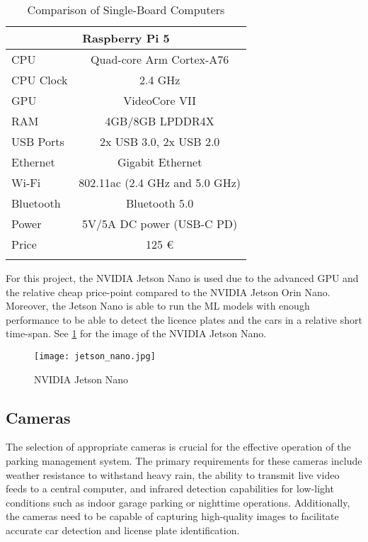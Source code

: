 \begin{longtable}{|l|c|}
	\multicolumn{2}{|c|}{\textbf{Raspberry Pi 5}}                             \\
	\hline
	CPU       & Quad-core Arm Cortex-A76                                      \\
	CPU Clock & 2.4 GHz                                                       \\
	GPU       & VideoCore VII                                                 \\
	RAM       & 4GB/8GB LPDDR4X                                               \\
	USB Ports & 2x USB 3.0, 2x USB 2.0                                        \\
	Ethernet  & Gigabit Ethernet                                              \\
	Wi-Fi     & 802.11ac (2.4 GHz and 5.0 GHz)                                \\
	Bluetooth & Bluetooth 5.0                                                 \\
	Power     & 5V/5A DC power (USB-C PD)                                     \\
	Price     & 125 \euro                                                     \\
	\hline

	\caption{Comparison of Single-Board Computers} \label{tab:sbc-comparison} \\
\end{longtable}

For this project, the NVIDIA Jetson Nano is used due to the advanced GPU and the relative cheap price-point compared to the NVIDIA Jetson Orin Nano. Moreover, the Jetson Nano is able to run the \gls{ML} models with enough performance to be able to detect the licence plates and the cars in a relative short time-span. See \cref{fig:jetson-nano} for the image of the NVIDIA Jetson Nano.

\begin{figure}
	\texttt{[image: jetson\_nano.jpg]}
	\caption{NVIDIA Jetson Nano}\label{fig:jetson-nano}
\end{figure}

\subsection{Cameras}

The selection of appropriate cameras is crucial for the effective operation of the parking management system. The primary requirements for these cameras include weather resistance to withstand heavy rain, the ability to transmit live video feeds to a central computer, and infrared detection capabilities for low-light conditions such as indoor garage parking or nighttime operations. Additionally, the cameras need to be capable of capturing high-quality images to facilitate accurate car detection and license plate identification.

